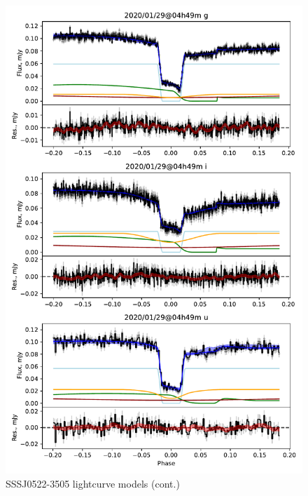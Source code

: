 \begin{figure}
    \centering
    \includegraphics[width=\textwidth]{figures/results/three_cvs_with_weird_colours/SSS111126/SSS111126_3.pdf}
    \caption{SSSJ0522-3505 lightcurve models (cont.)}
    \label{fig:SSSJ0522-3505 all lightcurves cont 2}
\end{figure}
\clearpage



